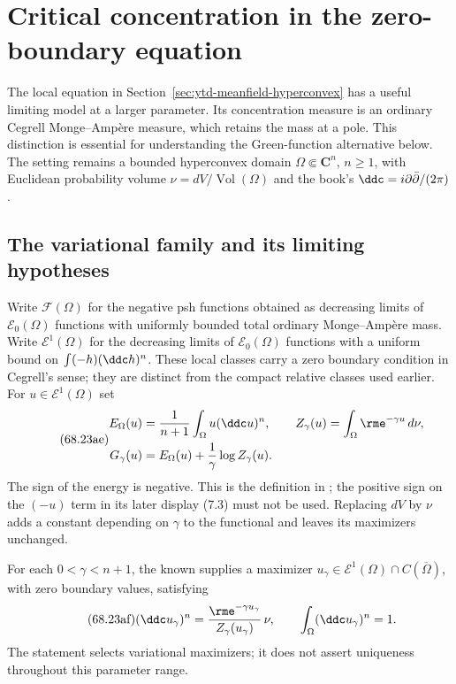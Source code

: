 \section{Critical concentration in the zero-boundary equation}
\label{sec:ytd-local-critical-concentration}

The local equation in Section~\ref{sec:ytd-meanfield-hyperconvex}
has a useful limiting model at a larger parameter. Its concentration
measure is an ordinary Cegrell Monge--Amp\`ere measure, which retains
the mass at a pole. This distinction is essential for understanding
the Green-function alternative below. The setting remains a bounded
hyperconvex domain $\Omega\Subset\mathbf C^n$, $n\geq1$, with
Euclidean probability volume $\nu=dV/\operatorname{Vol}(\Omega)$
and the book's $\ddc=i\partial\bar\partial/(2\pi)$.

\subsection{The variational family and its limiting hypotheses}
\label{sec:ytd-local-critical-family}

Write $\mathcal F(\Omega)$ for the negative psh functions obtained
as decreasing limits of $\mathcal E_0(\Omega)$ functions with
uniformly bounded total ordinary Monge--Amp\`ere mass. Write
$\mathcal E^1(\Omega)$ for the decreasing limits of
$\mathcal E_0(\Omega)$ functions with a uniform bound on
$\int(-h)(\ddc h)^n$. These local classes carry a zero boundary condition
in Cegrell's sense; they are distinct from the compact relative
classes used earlier. For $u\in\mathcal E^1(\Omega)$ set
\[
\tag{68.23ae}\label{eq:ytd-local-critical-functional}
\begin{aligned}
 E_\Omega(u)&=\frac1{n+1}\int_\Omega u(\ddc u)^n,\qquad
 Z_\gamma(u)=\int_\Omega\rme^{-\gamma u}\,d\nu,\\
 G_\gamma(u)&=E_\Omega(u)+\frac1\gamma\log Z_\gamma(u).
\end{aligned}
\]
The sign of the energy is negative. This is the definition in
\cite[Section~4.2]{BB22MTPublished}; the positive sign on the
$(-u)$ term in its later display (7.3) must not be used.
Replacing $dV$ by $\nu$ adds a constant depending on $\gamma$
to the functional and leaves its maximizers unchanged.

For each $0<\gamma<n+1$, the known
\cite[Theorem~7.2]{BB22MTPublished} supplies a maximizer
$u_\gamma\in\mathcal E^1(\Omega)\cap C(\overline\Omega)$,
with zero boundary values, satisfying
\[
\tag{68.23af}\label{eq:ytd-local-critical-equation}
 (\ddc u_\gamma)^n
    =\frac{\rme^{-\gamma u_\gamma}}{Z_\gamma(u_\gamma)}\,\nu,
 \qquad\int_\Omega(\ddc u_\gamma)^n=1.
\]
The statement selects variational maximizers; it does not assert
uniqueness throughout this parameter range.

